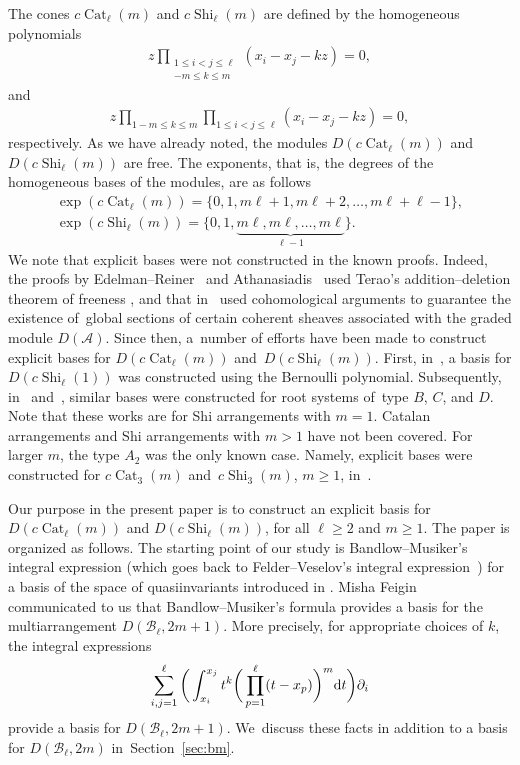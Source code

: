 \documentclass[10pt,a4paper]{amsart}
\numberwithin{equation}{section}
\newcommand{\A}{\mathcal{A}}
\newcommand{\B}{\mathcal{B}}
\newcommand{\Cat}{\operatorname{Cat}}
\newcommand{\Shi}{\operatorname{Shi}}
\begin{document}
The cones $c\Cat_\ell(m)$ and $c\Shi_\ell(m)$ are defined by the homogeneous
polynomials
\begin{gather*}
z\!\!\! \prod_{\substack{1\leq i<j\leq \ell\\ -m\leq k\leq m}}(x_i-x_j-kz)=0,
\end{gather*}
and %
\begin{gather*}
z\!\!\! \prod_{1-m\leq k\leq m}\prod_{1\leq i<j\leq \ell}(x_i-x_j-kz)=0,
\end{gather*}
respectively.
As we have already noted, the modules
$D(c\Cat_\ell(m))$ and $D(c\Shi_\ell(m))$ are free. The exponents, that
is, the degrees of the homogeneous bases of the modules, are as follows
\begin{gather*}
\exp(c\Cat_\ell(m))=\{0, 1, m\ell+1, m\ell+2, \dots, m\ell+\ell-1\},
\\
\exp(c\Shi_\ell(m))=\{0, 1, \underbrace{m\ell, m\ell, \dots, m\ell}_{\ell-1}\}.
\end{gather*}
We note that explicit bases were not constructed in the known proofs.
Indeed, the proofs by Edelman--Reiner~\cite{ede-rei} and
Athanasiadis~\cite{ath-free} used Terao's addition--deletion theorem
of freeness \cite[Theorem 4.51]{ot}, and that in~\cite{yos-char}
used cohomological arguments to guarantee the existence
of~glo\-bal sections of certain coherent sheaves associated with
the graded module $D(\A)$.
Since then, a~number of efforts have been made to construct explicit bases for
$D(c\Cat_\ell(m))$ and~$D(c\Shi_\ell(m))$.
First, in~\cite{su-te}, a basis for $D(c\Shi_\ell(1))$ was constructed
using the Bernoulli polynomial. Subsequently, in~\cite{gpt} and~\cite{su-bc},
similar bases were constructed for root systems of~type $B$, $C$, and $D$.
Note that these works are for Shi arrangements with $m=1$.
Catalan arran\-gements and Shi arrangements with $m>1$ have not been covered.
For larger $m$, the type
$A_2$ was the only known case. Namely, explicit bases were constructed
for $c\Cat_3(m)$ and~$c\Shi_3(m)$, $m\geq 1$, in~\cite{abe-suy}.

Our purpose in the present paper is to construct an explicit basis
for $D(c\Cat_\ell(m))$ and $D(c\Shi_\ell(m))$, for all $\ell\geq 2$ and $m\geq 1$.
The paper is organized as follows.
The starting point of our study is Bandlow--Musiker's integral expression
\cite{bm} (which goes back to Felder--Veselov's integral expression~\cite{fel-ves})
for a basis of the space of quasiinvariants introduced in
\cite{cha-ves, fei-ves}. Misha Feigin~\cite{feigin} communicated to us
that Bandlow--Musiker's formula provides a basis for the multiarrangement
$D(\B_\ell, 2m+1)$.
More precisely, for appropriate choices
of $k$, the integral expressions
\begin{gather}\label{eq:introbm}
\sum_{i, j=1}^\ell
\bigg(\int_{x_i}^{x_j}t^k\bigg(\prod_{p=1}^\ell(t-x_p)\bigg)^m {\rm d}t\bigg)\partial_i
\end{gather}
provide a basis for $D(\B_\ell, 2m+1)$. We~discuss these facts
in addition to a basis for $D(\B_\ell, 2m)$ in~Section~\ref{sec:bm}.
\end{document}

